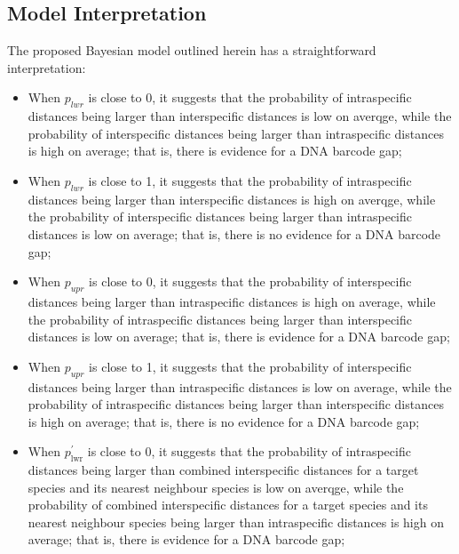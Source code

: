 \documentclass[12pt]{article}
\begin{document}
\subsection{Model Interpretation}

The proposed Bayesian model outlined herein has a straightforward interpretation:

\begin{itemize}
\item When $p_{lwr}$ is close to 0, it suggests that the probability of intraspecific distances being larger than interspecific distances is low on averqge, while the probability of interspecific distances being larger than intraspecific distances is high on average; that is, there is evidence for a DNA barcode gap;

\vspace{1mm}

\item When $p_{lwr}$ is close to 1, it suggests that the probability of intraspecific distances being larger than interspecific distances is high on averqge, while the probability of interspecific distances being larger than intraspecific distances is low on average; that is, there is no evidence for a DNA barcode gap;

\vspace{1mm}

\item When $p_{upr}$ is close to 0, it suggests that the probability of interspecific distances being larger than intraspecific distances is high on average, while the probability of intraspecific distances being larger than interspecific distances is low on average; that is, there is evidence for a DNA barcode gap;

\vspace{1mm}

\item When $p_{upr}$ is close to 1, it suggests that the probability of interspecific distances being larger than intraspecific distances is low on average, while the probability of intraspecific distances being larger than interspecific distances is high on average; that is, there is no evidence for a DNA barcode gap;

\vspace{1mm}

\item When $p^{'}_\mathrm{lwr}$ is close to 0, it suggests that the probability of intraspecific distances being larger than combined interspecific distances for a target species and its nearest neighbour species is low on averqge, while the probability of combined interspecific distances for a target species and its nearest neighbour species being larger than intraspecific distances is high on average; that is, there is evidence for a DNA barcode gap;


\end{itemize}
\end{document}
